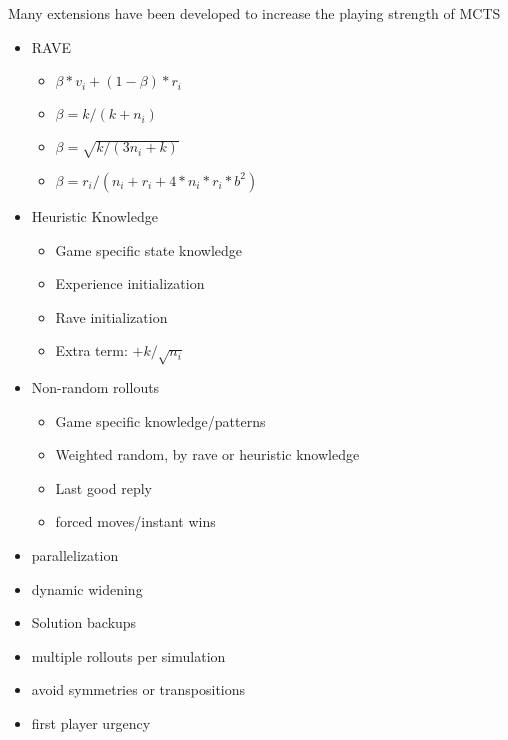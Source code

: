 Many extensions have been developed to increase the playing strength of MCTS

\begin{itemize}
\item RAVE
	\begin{itemize}
		\item $\beta*v_i + (1-\beta)*r_i$
		\item $\beta = k/(k+n_i)$
		\item $\beta = \sqrt{k/(3n_i+k)}$
		\item $\beta = r_i/(n_i+r_i+4*n_i*r_i*b^2)$
	\end{itemize}
\item Heuristic Knowledge
	\begin{itemize}
		\item Game specific state knowledge
		\item Experience initialization
		\item Rave initialization
		\item Extra term: $ + k/\sqrt{n_i}$
	\end{itemize}
\item Non-random rollouts
	\begin{itemize}
		\item Game specific knowledge/patterns
		\item Weighted random, by rave or heuristic knowledge
		\item Last good reply
		\item forced moves/instant wins
	\end{itemize}
\item parallelization
\item dynamic widening
\item Solution backups
\item multiple rollouts per simulation
\item avoid symmetries or transpositions
\item first player urgency

\end{itemize}















